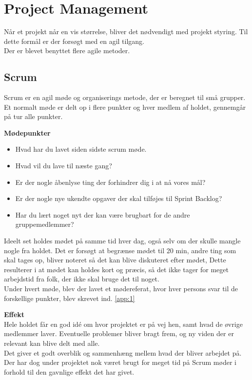 \newpage
\section{Project Management}

Når et projekt når en vis størrelse, bliver det nødvendigt med projekt styring. Til dette formål er der forsøgt med en agil tilgang.\\

Der er blevet benyttet flere agile metoder.

\subsection{Scrum}

Scrum er en agil møde og organiserings metode, der er beregnet til små grupper. Et normalt møde er delt op i flere punkter og hver medlem af holdet, gennemgår på tur alle punkter.

\textbf{Mødepunkter}
\begin{itemize}[noitemsep]
	\item Hvad har du lavet siden sidste scrum møde.
	\item Hvad vil du lave til næste gang?
	\item Er der nogle åbenlyse ting der forhindrer dig i at nå vores mål?
	\item Er der nogle nye ukendte opgaver der skal tilføjes til Sprint Backlog?
	\item Har du lært noget nyt der kan være brugbart for de andre gruppemedlemmer?
\end{itemize}

Ideelt set holdes mødet på samme tid hver dag, også selv om der skulle mangle nogle fra holdet.
Det er forsøgt at begrænse mødet til 20 min, andre ting som skal tages op, bliver noteret så det kan blive diskuteret efter mødet, Dette resulterer i at mødet kan holdes kort og præcis, så det ikke tager for meget arbejdstid fra folk, der ikke skal bruge det til noget.\\

Under hvert møde, blev der lavet et mødereferat, hvor hver persons svar til de forskellige punkter, blev skrevet ind. \autoref{app:1}


\textbf{Effekt}\\

Hele holdet får en god idé om hvor projektet er på vej hen, samt hvad de øvrige medlemmer laver.
Eventuelle problemer bliver bragt frem, og ny viden der er relevant kan blive delt med alle.\\
Det giver et godt overblik og sammenhæng mellem hvad der bliver arbejdet på. Der har dog under projektet nok været brugt for meget tid på Scrum møder i forhold til den gavnlige effekt det har givet.


